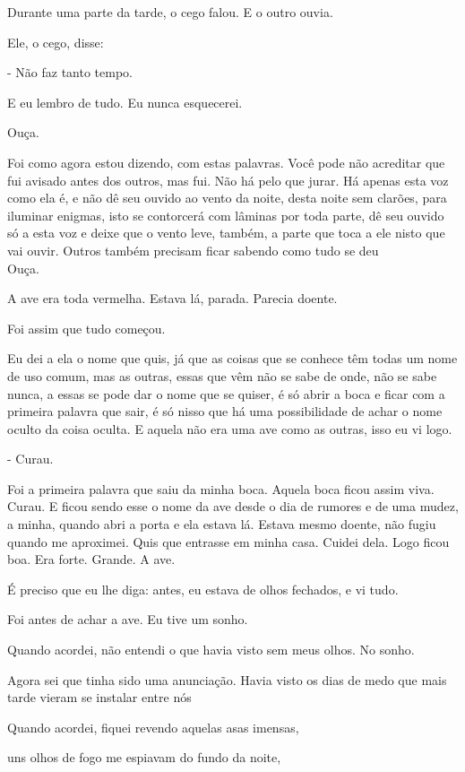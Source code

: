 Durante uma parte da tarde, o cego falou. E o outro ouvia.

Ele, o cego, disse:

- Não faz tanto tempo.

E eu lembro de tudo. Eu nunca esquecerei.

Ouça.

Foi como agora estou dizendo, com estas palavras. Você pode não
acreditar que fui avisado antes dos outros, mas fui. Não há pelo que
jurar. Há apenas esta voz como ela é, e não dê seu ouvido ao vento da
noite, desta noite sem clarões, para iluminar enigmas, isto se
contorcerá com lâminas por toda parte, dê seu ouvido só a esta voz e
deixe que o vento leve, também, a parte que toca a ele nisto que vai
ouvir. Outros também precisam ficar sabendo como tudo se deu\\

Ouça.

A ave era toda vermelha. Estava lá, parada. Parecia doente.

Foi assim que tudo começou.

Eu dei a ela o nome que quis, já que as coisas que se conhece têm todas
um nome de uso comum, mas as outras, essas que vêm não se sabe de onde,
não se sabe nunca, a essas se pode dar o nome que se quiser, é só abrir
a boca e ficar com a primeira palavra que sair, é só nisso que há uma
possibilidade de achar o nome oculto da coisa oculta. E aquela não era
uma ave como as outras, isso eu vi logo.

- Curau.

Foi a primeira palavra que saiu da minha boca. Aquela boca ficou assim
viva. Curau. E ficou sendo esse o nome da ave desde o dia de rumores e
de uma mudez, a minha, quando abri a porta e ela estava lá. Estava mesmo
doente, não fugiu quando me aproximei. Quis que entrasse em minha casa.
Cuidei dela. Logo ficou boa. Era forte. Grande. A ave.

É preciso que eu lhe diga: antes, eu estava de olhos fechados, e vi
tudo.

Foi antes de achar a ave. Eu tive um sonho.

Quando acordei, não entendi o que havia visto sem meus olhos. No sonho.

Agora sei que tinha sido uma anunciação. Havia visto os dias de medo que
mais tarde vieram se instalar entre nós

Quando acordei, fiquei revendo aquelas asas imensas,

uns olhos de fogo me espiavam do fundo da noite,

